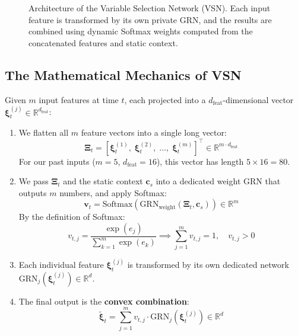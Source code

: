 \documentclass[11pt,a4paper]{article}
\begin{document}
\begin{figure}[htbp]
{%
}
\caption{Architecture of the Variable Selection Network (VSN). Each input feature is transformed by its own private GRN, and the results are combined using dynamic Softmax weights computed from the concatenated features and static context.}
\label{fig:vsn_diagram}
\end{figure}

\subsection{The Mathematical Mechanics of VSN}
Given $m$ input features at time $t$, each projected into a $d_{\text{feat}}$-dimensional vector $\boldsymbol{\xi}_t^{(j)} \in \mathbb{R}^{d_{\text{feat}}}$:
\begin{enumerate}
    \item We flatten all $m$ feature vectors into a single long vector:
    \begin{equation}
        \mathbf{\Xi}_t = [\boldsymbol{\xi}_t^{(1)}, \; \boldsymbol{\xi}_t^{(2)}, \; \dots, \; \boldsymbol{\xi}_t^{(m)}]^\top \in \mathbb{R}^{m \cdot d_{\text{feat}}}
    \end{equation}
    For our past inputs ($m=5$, $d_{\text{feat}}=16$), this vector has length $5 \times 16 = 80$.
    \item We pass $\mathbf{\Xi}_t$ and the static context $\mathbf{c}_s$ into a dedicated weight GRN that outputs $m$ numbers, and apply Softmax:
    \begin{equation}
        \mathbf{v}_t = \mathrm{Softmax}\left(\mathrm{GRN}_{\text{weight}}(\mathbf{\Xi}_t, \mathbf{c}_s)\right) \in \mathbb{R}^m
    \end{equation}
    By the definition of Softmax:
    \begin{equation}
        v_{t, j} = \frac{\exp(e_j)}{\sum_{k=1}^m \exp(e_k)} \implies \sum_{j=1}^m v_{t, j} = 1, \quad v_{t, j} > 0
    \end{equation}
    \item Each individual feature $\boldsymbol{\xi}_t^{(j)}$ is transformed by its own dedicated network $\mathrm{GRN}_j(\boldsymbol{\xi}_t^{(j)}) \in \mathbb{R}^d$.
    \item The final output is the \textbf{convex combination}:
    \begin{equation}
        \tilde{\boldsymbol{\xi}}_t = \sum_{j=1}^m v_{t, j} \cdot \mathrm{GRN}_j\left(\boldsymbol{\xi}_t^{(j)}\right) \in \mathbb{R}^d
    \end{equation}
\end{enumerate}
\end{document}
